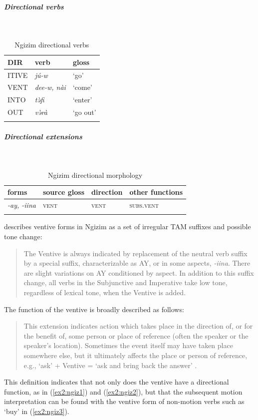 \subparagraph{Directional verbs}~



\begin{table}[H]
	\caption{Ngizim directional verbs} 
	\label{tab:ngizV}
	\begin{tabular}{lll} %
		\lsptoprule
		DIR & verb & gloss   \\ %
		\midrule
		ITIVE & \textit{jú-w} & `go' \\
		VENT & \textit{dee-w, nài} & `come' \\ 
		INTO& \textit{tə̀fi} & `enter' \\
		OUT & \textit{və̀rà} & `go out' \\
		\lspbottomrule
	\end{tabular}
\end{table}

\subparagraph{Directional extensions}~



\begin{table}[H]
	\caption{Ngizim directional morphology}
	\label{tab:ngiz}
	\begin{tabular}{llll} %
		\lsptoprule
		forms & source gloss & direction  & other functions \\ %
		\midrule
		\textit{-ay, -iina}  &  \textsc{vent}  &   \textsc{vent} &   \textsc{subs.vent}  \\
		\lspbottomrule
	\end{tabular}
\end{table} 

\citet[26]{schuhAspectsNgizimSyntax1972} describes ventive forms in Ngizim as a set of irregular TAM suffixes and possible tone change: \begin{quote}The Ventive is always indicated by replacement of the neutral verb suffix by a special suffix, characterizable as AY, or in some aspects, \textit{-iina}. There are slight variations on AY conditioned by aspect. In addition to this suffix change, all verbs in the Subjunctive and Imperative take low tone, regardless of lexical tone, when the Ventive is added.\end{quote} 

The function of the ventive is broadly described as follows: \begin{quote}
This extension indicates action which takes place in the direction of, or for the benefit of, some person or place of reference (often the speaker or the speaker's location). Sometimes the event itself may have taken place somewhere else, but it ultimately affects the place or person of reference, e.g., `ask' + Ventive = `ask and bring back the answer' \citep[26]{schuhAspectsNgizimSyntax1972}.\end{quote} This definition indicates that not only does the ventive have a directional function, as in (\ref{ex2:ngiz1}) and (\ref{ex2:ngiz2}), but that the subsequent motion interpretation can be found with the ventive form of non-motion verbs such as `buy' in (\ref{ex2:ngiz3}). 

